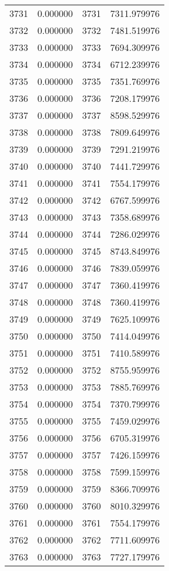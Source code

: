 \documentclass[12pt]{article}
\begin{document}
\begin{longtable}{@{}cccc@{}}
3731 & 0.000000 & 3731 & 7311.979976 \\
3732 & 0.000000 & 3732 & 7481.519976 \\
3733 & 0.000000 & 3733 & 7694.309976 \\
3734 & 0.000000 & 3734 & 6712.239976 \\
3735 & 0.000000 & 3735 & 7351.769976 \\
3736 & 0.000000 & 3736 & 7208.179976 \\
3737 & 0.000000 & 3737 & 8598.529976 \\
3738 & 0.000000 & 3738 & 7809.649976 \\
3739 & 0.000000 & 3739 & 7291.219976 \\
3740 & 0.000000 & 3740 & 7441.729976 \\
3741 & 0.000000 & 3741 & 7554.179976 \\
3742 & 0.000000 & 3742 & 6767.599976 \\
3743 & 0.000000 & 3743 & 7358.689976 \\
3744 & 0.000000 & 3744 & 7286.029976 \\
3745 & 0.000000 & 3745 & 8743.849976 \\
3746 & 0.000000 & 3746 & 7839.059976 \\
3747 & 0.000000 & 3747 & 7360.419976 \\
3748 & 0.000000 & 3748 & 7360.419976 \\
3749 & 0.000000 & 3749 & 7625.109976 \\
3750 & 0.000000 & 3750 & 7414.049976 \\
3751 & 0.000000 & 3751 & 7410.589976 \\
3752 & 0.000000 & 3752 & 8755.959976 \\
3753 & 0.000000 & 3753 & 7885.769976 \\
3754 & 0.000000 & 3754 & 7370.799976 \\
3755 & 0.000000 & 3755 & 7459.029976 \\
3756 & 0.000000 & 3756 & 6705.319976 \\
3757 & 0.000000 & 3757 & 7426.159976 \\
3758 & 0.000000 & 3758 & 7599.159976 \\
3759 & 0.000000 & 3759 & 8366.709976 \\
3760 & 0.000000 & 3760 & 8010.329976 \\
3761 & 0.000000 & 3761 & 7554.179976 \\
3762 & 0.000000 & 3762 & 7711.609976 \\
3763 & 0.000000 & 3763 & 7727.179976 \\

\end{longtable}
\end{document}
